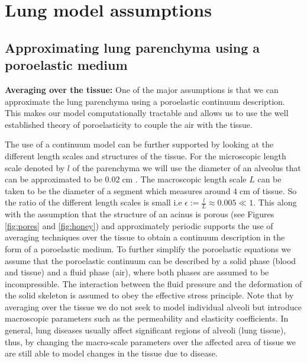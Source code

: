 \section{Lung model assumptions}
%
%
\label{sec:assumptions}
%
%

\subsection{Approximating lung parenchyma using a poroelastic medium}

\noindent \newline \textbf{Averaging over the tissue:} One of the major assumptions is that we can approximate the lung parenchyma using a poroelastic continuum description. This makes our model computationally tractable and allows us to use the well established theory of poroelasticity to couple the air with the tissue.

The use of a continuum model can be further supported by looking at the different length scales and structures of the tissue. For the microscopic length scale denoted by $l$ of the parenchyma we will use the diameter of an alveolus that can be approximated to be $0.02 \; \mbox{cm}$ \cite{ochs2004number}. The macroscopic length scale $L$ can be taken to be the diameter of a segment which measures around $4\;\mbox{cm}$ of tissue. So the ratio of the different length scales is small i.e $\epsilon := \frac{l}{L} \approx 0.005 \ll 1$. This along with the assumption that the structure of an acinus is porous (see Figures \ref{fig:pores} and \ref{fig:honey}) and approximately periodic supports the use of averaging techniques over the tissue to obtain a continuum description  in the form of a poroelastic medium. To further simplify the poroelastic equations we assume that the poroelastic continuum can be described by a solid phase (blood and tissue) and a fluid phase (air), where both phases are assumed to be incompressible. The interaction between the fluid pressure and the deformation of the solid skeleton is assumed to obey the effective stress principle. Note that by averaging over the tissue we do not seek to model individual alveoli but introduce macroscopic parameters such as the permeability and elasticity coefficients. In general, lung diseases usually affect significant regions of alveoli (lung tissue), thus, by changing the macro-scale parameters over the affected area of tissue we are still able to model changes in the tissue due to disease.

